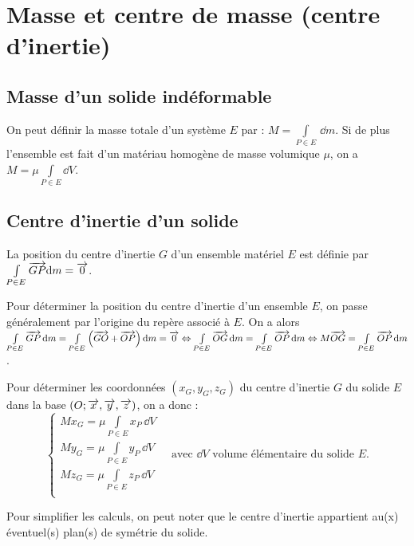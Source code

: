 \documentclass[10pt,fleqn]{article} %
\begin{document}

\setlength{\columnseprule}{.1pt}

\vspace{2cm}
\pagestyle{fancy}
\thispagestyle{plain}


\section{Masse et centre de masse (centre d'inertie)}
\subsection{Masse d'un solide indéformable}
\begin{defi}
On peut définir la masse totale d'un système $E$ par : $M=\int\limits_{P\in E} \,\dd m$. Si de plus l'ensemble est fait d'un matériau homogène de masse volumique $\mu$, on a $M=\mu \int\limits_{P\in E} \dd V$. \end{defi}

\subsection{Centre d'inertie d'un solide}

\begin{defi}
La position du centre d'inertie $G$ d'un ensemble matériel $E$ est définie par $\int\limits_{P\in E} \overrightarrow{GP} \text{d} m = \overrightarrow{0}$.
\end{defi}

Pour déterminer la position du centre d'inertie d'un ensemble $E$, on passe généralement par l'origine du repère associé à $E$. On a alors 
$\int\limits_{P\in E} \overrightarrow{GP} \, \text{d} m=\int\limits_{P\in E} \left(\overrightarrow{GO}+\overrightarrow{OP}\right) \text{d} m = \overrightarrow{0} 
\Leftrightarrow \int\limits_{P\in E} \overrightarrow{OG} \,\text{d} m =\int\limits_{P\in E} \overrightarrow{OP} \,\text{d} m
\Leftrightarrow  M\overrightarrow{OG} =\int\limits_{P\in E} \overrightarrow{OP} \,\text{d} m$.

\begin{methode}
Pour déterminer les coordonnées $\left(x_G,y_G,z_G\right)$ du centre d'inertie $G$ du solide $E$ dans la base $\left(O;\overrightarrow{x},\overrightarrow{y},\overrightarrow{z} \right)$, on a donc :
$$
\left\{
\begin{array}{l}
M x_G =\mu \int\limits_{P\in E} x_P \,\dd V \\
M y_G =\mu \int\limits_{P\in E} y_P \,\dd V \\
M z_G =\mu \int\limits_{P\in E} z_P \,\dd V \\
\end{array}
\right. \quad \text{avec }\dd V \text{ volume élémentaire du solide $E$.}
$$ 

Pour simplifier les calculs, on peut noter que le centre d'inertie appartient au(x) éventuel(s) plan(s) de symétrie du solide.
\end{methode}
\end{document}
